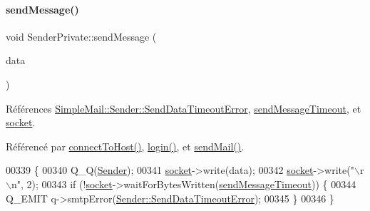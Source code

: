 \mbox{\label{class_simple_mail_1_1_sender_private_a01805bb24291bf6cad3a656a16d0bb25}} 
\paragraph{\texorpdfstring{send\+Message()}{sendMessage()}}
{\footnotesize\ttfamily void Sender\+Private\+::send\+Message (\begin{DoxyParamCaption}\item[{const Q\+Byte\+Array \&}]{data }\end{DoxyParamCaption})}



Références \hyperlink{class_simple_mail_1_1_sender_a276560e9e955ab6be451338c3776bf49a6ba07629b5f05025424b0bf377705caf}{Simple\+Mail\+::\+Sender\+::\+Send\+Data\+Timeout\+Error}, \hyperlink{class_simple_mail_1_1_sender_private_ac78cceae200dd8794a4a1ac4e79e8762}{send\+Message\+Timeout}, et \hyperlink{class_simple_mail_1_1_sender_private_a223cab47555a39f45f30569328fa20bc}{socket}.



Référencé par \hyperlink{class_simple_mail_1_1_sender_private_aa2f9a37cfe58c3e39afa75e79070cee1}{connect\+To\+Host()}, \hyperlink{class_simple_mail_1_1_sender_private_a927e5c262ee89fb335410ebec020091d}{login()}, et \hyperlink{class_simple_mail_1_1_sender_private_a2ede5284746e77ee37b8fe96f4bbb100}{send\+Mail()}.


\begin{DoxyCode}
00339 \{
00340     Q\_Q(\hyperlink{class_simple_mail_1_1_sender}{Sender});
00341     \hyperlink{class_simple_mail_1_1_sender_private_a223cab47555a39f45f30569328fa20bc}{socket}->write(data);
00342     \hyperlink{class_simple_mail_1_1_sender_private_a223cab47555a39f45f30569328fa20bc}{socket}->write(\textcolor{stringliteral}{"\(\backslash\)r\(\backslash\)n"}, 2);
00343     \textcolor{keywordflow}{if} (!\hyperlink{class_simple_mail_1_1_sender_private_a223cab47555a39f45f30569328fa20bc}{socket}->waitForBytesWritten(\hyperlink{class_simple_mail_1_1_sender_private_ac78cceae200dd8794a4a1ac4e79e8762}{sendMessageTimeout})) \{
00344         Q\_EMIT q->smtpError(\hyperlink{class_simple_mail_1_1_sender_a276560e9e955ab6be451338c3776bf49a6ba07629b5f05025424b0bf377705caf}{Sender::SendDataTimeoutError});
00345     \}
00346 \}
\end{DoxyCode}
\mbox{\label{class_simple_mail_1_1_sender_private_aea040b22ce411e03111080e7546f91c0}} 
